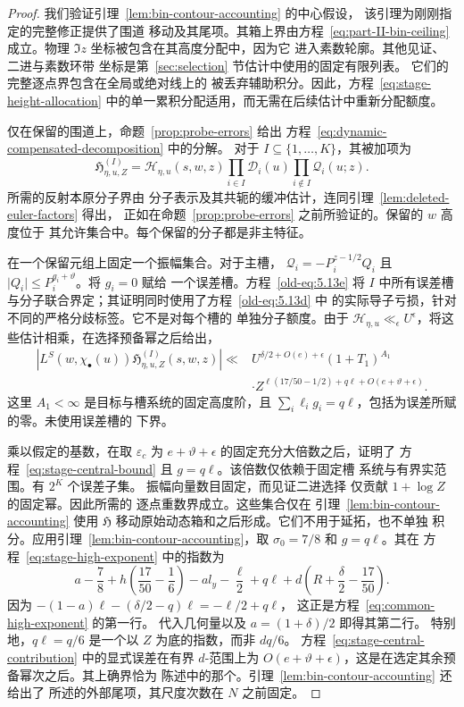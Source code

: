\documentclass[11pt,a4paper]{article}
\numberwithin{equation}{section}
\numberwithin{figure}{section}
\theoremstyle{definition}
\theoremstyle{remark}
\begin{document}
\begin{proof}
我们验证引理~\ref{lem:bin-contour-accounting} 的中心假设，
该引理为刚刚指定的完整修正提供了围道
移动及其尾项。其箱上界由方程~\eqref{eq:part-II-bin-ceiling} 成立。物理
\(\Im z\) 坐标被包含在其高度分配中，因为它
进入素数轮廓。其他见证、二进与素数环带
坐标是第~\ref{sec:selection} 节估计中使用的固定有限列表。
它们的完整逐点界包含在全局或绝对线上的
被丢弃辅助积分。因此，方程~\eqref{eq:stage-height-allocation}
中的单一累积分配适用，而无需在后续估计中重新分配额度。

仅在保留的围道上，命题~\ref{prop:probe-errors} 给出
方程~\eqref{eq:dynamic-compensated-decomposition} 中的分解。
对于 \(I\subseteq\{1,\ldots,K\}\)，其被加项为
\[
 \mathfrak H_{\eta,u,Z}^{(I)}
 =\mathcal H_{\eta,u}(s,w,z)
       \prod_{i\in I}\mathcal D_i(u)
       \prod_{i\notin I}\mathcal Q_i(u;z).
\]
所需的反射本原分子界由
分子表示及其共轭的缓冲估计，连同引理~\ref{lem:deleted-euler-factors} 得出，
正如在命题~\ref{prop:probe-errors} 之前所验证的。保留的 \(w\) 高度位于
其允许集合中。每个保留的分子都是非主特征。

在一个保留元组上固定一个振幅集合。对于主槽，
\(\mathcal Q_i=-P_i^{z-1/2}Q_i\) 且
\(\lvert Q_i\rvert\le P_i^{g_i+\vartheta}\)。将 \(g_i=0\) 赋给
一个误差槽。方程~\eqref{old-eq:5.13e} 将 \(I\) 中所有误差槽
与分子联合界定；其证明同时使用了方程~\eqref{old-eq:5.13d} 中
的实际导子亏损，针对不同的严格分歧标签。它不是对每个槽的
单独分子额度。由于
\(\mathcal H_{\eta,u}\ll_\epsilon U^\epsilon\)，将这些估计相乘，在选择预备幂之后给出，
\[
 \begin{split}
 \left|L^S(w,\chi_\bullet(u))
       \mathfrak H_{\eta,u,Z}^{(I)}(s,w,z)\right|
 \ll{}&U^{\delta/2+O(e)+\epsilon}(1+T_1)^{A_1}\\
 &\cdot
 Z^{\ell(17/50-1/2)+q\ell+O(e+\vartheta+\epsilon)}.
 \end{split}
\]
这里 \(A_1<\infty\) 是目标与槽系统的固定高度阶，且
\(\sum_i\ell_i g_i=q\ell\)，包括为误差所赋的零。未使用误差槽的
下界。

乘以假定的基数，在取
\(\varepsilon_c\) 为 \(e+\vartheta+\epsilon\) 的固定充分大倍数之后，证明了
方程~\eqref{eq:stage-central-bound} 且 \(g=q\ell\)。该倍数仅依赖于固定槽
系统与有界实范围。有 \(2^K\) 个误差子集。
振幅向量数目固定，而见证二进选择
仅贡献 \(1+\log Z\) 的固定幂。因此所需的
逐点重数界成立。这些集合仅在
引理~\ref{lem:bin-contour-accounting} 使用
\(\mathfrak H\) 移动原始动态箱和之后形成。它们不用于延拓，也不单独
积分。应用引理~\ref{lem:bin-contour-accounting}，取 \(\sigma_0=7/8\)
和 \(g=q\ell\)。其在
方程~\eqref{eq:stage-high-exponent} 中的指数为
\[
 a-\frac78+h\left(\frac{17}{50}-\frac16\right)-a l_y-\frac{\ell}{2}
       +q\ell+d\left(R+\frac\delta2-\frac{17}{50}\right).
\]
因为
\(-(1-a)\ell-(\delta/2-q)\ell=-\ell/2+q\ell\)，
这正是方程~\eqref{eq:common-high-exponent} 的第一行。
代入几何量以及 \(a=(1+\delta)/2\) 即得其第二行。
特别地，\(q\ell=q/6\) 是一个以 \(Z\) 为底的指数，而非 \(dq/6\)。
方程~\eqref{eq:stage-central-contribution} 中的显式误差在有界 \(d\)-范围上为
\(O(e+\vartheta+\epsilon)\)，这是在选定其余预备幂次之后。其上确界恰为
陈述中的那个。引理~\ref{lem:bin-contour-accounting} 还给出了
所述的外部尾项，其尺度次数在 \(N\) 之前固定。
\end{proof}
\end{document}
